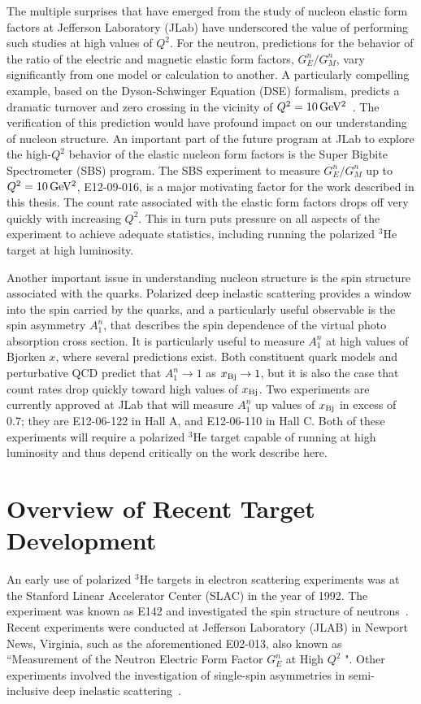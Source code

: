 The multiple surprises that have emerged from the study of nucleon elastic form factors at Jefferson Laboratory (JLab) have underscored the value of performing such studies at high values of $Q^2$. For the neutron, predictions for the behavior of the ratio of the electric and magnetic elastic form factors, $G_E^n/G_M^n$, vary significantly from one model or calculation to another. A particularly compelling example, based on the Dyson-Schwinger Equation (DSE) formalism, predicts a dramatic turnover and zero crossing in the vicinity of $Q^2 = \rm 10\,GeV^2$~\cite{Cloet}. The verification of this prediction would have profound impact on our understanding of nucleon structure. An important part of the future program at JLab to explore the high-$Q^2$ behavior of the elastic nucleon form factors is the Super Bigbite Spectrometer (SBS) program. The SBS experiment to measure $G_E^n/G_M^n$ up to $Q^2 = \rm 10\,GeV^2$, E12-09-016, is a major motivating factor for the work described in this thesis. The count rate associated with the elastic form factors drops off very quickly with increasing $Q^2$. This in turn puts pressure on all aspects of the experiment to achieve adequate statistics, including running the polarized $^3$He target at high luminosity.  

Another important issue in understanding nucleon structure is the spin structure associated with the quarks. Polarized deep inelastic scattering provides a window into the spin carried by the quarks, and a particularly useful observable is the spin asymmetry $A_1^n$, that describes the spin dependence of the virtual photo absorption cross section. It is particularly useful to measure $A_1^n$ at high values of Bjorken $x$, where several predictions exist. Both constituent quark models and perturbative QCD predict that $A_1^n \rightarrow 1$ as $x_{\rm Bj} \rightarrow 1$, but it is also the case that count rates drop quickly toward high values of  $x_{\rm Bj}$. Two experiments are currently approved at JLab that will measure $A_1^n$ up values of  $x_{\rm Bj}$ in excess of 0.7; they are E12-06-122 in Hall A, and E12-06-110 in Hall C. Both of these experiments will require a polarized $^3$He target capable of running at high luminosity and thus depend critically on the work describe here.  

\section{Overview of Recent Target Development}

An early use of polarized $^3$He targets in electron scattering experiments was at the Stanford Linear Accelerator Center (SLAC) in the year of 1992. The experiment was known as E142 and investigated the spin structure of neutrons~\cite{PhysRevLett.71.959}. Recent experiments were conducted at Jefferson Laboratory (JLAB) in Newport News, Virginia, such as the aforementioned E02-013, also known as ``Measurement of the Neutron Electric Form Factor $G^n_E$ at High $Q^2$ ". Other experiments involved the investigation of single-spin asymmetries in semi-inclusive deep inelastic scattering~\cite{PhysRevLett.107.072003}.

